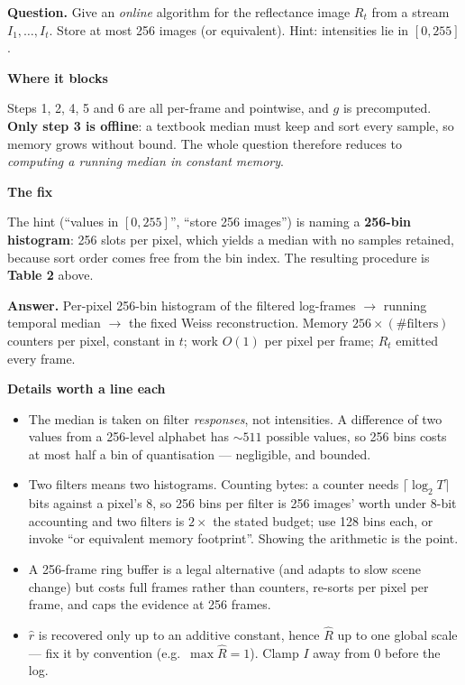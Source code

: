 \documentclass[11pt]{article}
\newcommand{\step}[1]{\smallskip\par\noindent\textbf{\textcolor{amber}{#1}}\par\nobreak}
\newcommand{\ans}[1]{\begin{answer}\textbf{Answer.} #1\end{answer}}
\begin{document}
\begin{qbox}\textbf{Question.} Give an \emph{online} algorithm for the reflectance image $R_t$ from a stream
$I_1,\dots,I_t$. Store at most 256 images (or equivalent). Hint: intensities lie in $[0,255]$.\end{qbox}

\step{Where it blocks}
Steps 1, 2, 4, 5 and 6 are all per-frame and pointwise, and $g$ is precomputed. \textbf{Only step 3 is
offline}: a textbook median must keep and sort every sample, so memory grows without bound. The whole question
therefore reduces to \emph{computing a running median in constant memory}.

\step{The fix}
The hint (``values in $[0,255]$'', ``store 256 images'') is naming a \textbf{256-bin histogram}: 256 slots per
pixel, which yields a median with no samples retained, because sort order comes free from the bin index. The
resulting procedure is \textbf{Table 2} above.

\ans{Per-pixel 256-bin histogram of the filtered log-frames $\to$ running temporal median $\to$ the fixed Weiss
reconstruction. Memory $256\times(\#\text{filters})$ counters per pixel, constant in $t$; work $O(1)$ per pixel
per frame; $R_t$ emitted every frame.}

\step{Details worth a line each}
\begin{itemize}
  \item The median is taken on filter \emph{responses}, not intensities. A difference of two values from a
        256-level alphabet has ${\sim}511$ possible values, so 256 bins costs at most half a bin of
        quantisation --- negligible, and bounded.
  \item Two filters means two histograms. Counting bytes: a counter needs $\lceil\log_2 T\rceil$ bits against
        a pixel's 8, so 256 bins per filter is 256 images' worth under 8-bit accounting and two filters is
        $2\times$ the stated budget; use 128 bins each, or invoke ``or equivalent memory footprint''. Showing
        the arithmetic is the point.
  \item A 256-frame ring buffer is a legal alternative (and adapts to slow scene change) but costs full frames
        rather than counters, re-sorts per pixel per frame, and caps the evidence at 256 frames.
  \item $\hat r$ is recovered only up to an additive constant, hence $\hat R$ up to one global scale --- fix it
        by convention (e.g.\ $\max \hat R = 1$). Clamp $I$ away from $0$ before the log.
\end{itemize}
\end{document}
